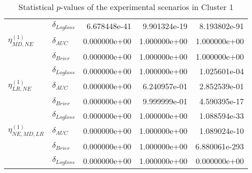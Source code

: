 \begin{table}[!h]
\begin{tabular}{l|lrrr}
                              & $\delta_{Logloss}$ &           6.678448e-41 &     9.901324e-19 &             8.193802e-91 \\
    $\eta^{(1)}_{MD, NE}$ & $\delta_{AUC}$ &           0.000000e+00 &     1.000000e+00 &             1.000000e+00 \\
                              & $\delta_{Brier}$ &           0.000000e+00 &     1.000000e+00 &             1.000000e+00 \\
                              & $\delta_{Logloss}$ &           0.000000e+00 &     1.000000e+00 &             1.025601e-04 \\
    $\eta^{(1)}_{LR, NE}$ & $\delta_{AUC}$ &           0.000000e+00 &     6.240957e-01 &             2.852539e-01 \\
                              & $\delta_{Brier}$ &           0.000000e+00 &     9.999999e-01 &             4.590395e-17 \\
                              & $\delta_{Logloss}$ &           0.000000e+00 &     1.000000e+00 &             1.088594e-33 \\
    $\eta^{(1)}_{NE, MD, LR}$ & $\delta_{AUC}$ &           0.000000e+00 &     1.000000e+00 &             1.089024e-10 \\
                              & $\delta_{Brier}$ &           0.000000e+00 &     1.000000e+00 &            6.880061e-293 \\
                              & $\delta_{Logloss}$ &           0.000000e+00 &     1.000000e+00 &             0.000000e+00 \\
    \bottomrule
    \end{tabular}
    \caption{Statistical $p$-values of the experimental scenarios in Cluster 1}
    \end{table}
    
